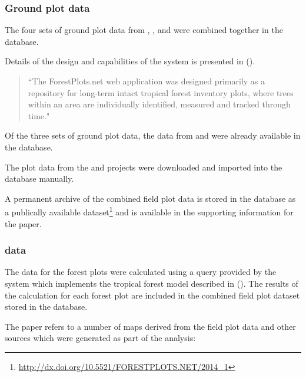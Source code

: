 \documentclass{article}
\begin{document}
\subsubsection{Ground plot data}

The four sets of ground plot data from \cite{rainfor}, \cite{atdn},
\cite{team} and \cite{ppbio} were combined together in the \cite{forest-plots}
database.

Details of the design and capabilities of the \cite{forest-plots} system
is presented in  (\cite{gonzalez-2011}).

\begin{quote}
``The ForestPlots.net web application was designed primarily as a repository
for long-term intact tropical forest inventory plots, where trees within
an area are individually identified, measured and tracked through time."
\end{quote}

Of the three sets of ground plot data, the data from \cite{rainfor} and
\cite{atdn} were already available in the \cite{forest-plots} database.

The plot data from the \cite{team} and \cite{ppbio} projects were downloaded
and imported into the \cite{forest-plots} database manually.

A permanent archive of the combined field plot data is stored
in the \cite{forest-plots} database as a publically available
dataset\footnote{\url{http://dx.doi.org/10.5521/FORESTPLOTS.NET/2014_1}}
and is available in the supporting information for the paper.

\subsubsection{\cite{term-agb} data}

The \cite{term-agb} data for the forest plots were calculated using a
\cite{comp-lang-sql} query provided by the \cite{forest-plots} system which
implements the tropical forest model described in 
(\cite{chave-2005}).
The results of the \cite{term-agb} calculation for each forest plot are
included in the combined field plot dataset stored in the \cite{forest-plots}
database.

The paper refers to a number of maps derived from the field plot data and
other sources which were generated as part of the analysis:
\end{document}
